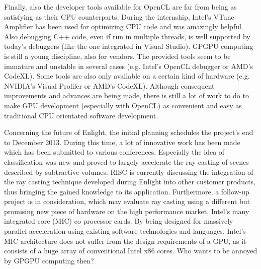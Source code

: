 Finally, also the developer tools available for OpenCL are far from being as satisfying as their CPU counterparts. During the internship, Intel's VTune Amplifier has been used for optimizing CPU code and was amazingly helpful. Also debugging C++ code, even if run in multiple threads, is well supported by today's debuggers (like the one integrated in Visual Studio). GPGPU computing is still a young discipline, also for vendors. The provided tools seem to be immature and unstable in several cases (e.g. Intel's OpenCL debugger or AMD's CodeXL). Some tools are also only available on a certain kind of hardware (e.g. NVIDIA's Visual Profiler or AMD's CodeXL). Although consequent improvements and advances are being made, there is still a lot of work to do to make GPU development (especially with OpenCL) as convenient and easy as traditional CPU orientated software development.

Concerning the future of Enlight, the initial planning schedules the project's end to December 2013. During this time, a lot of innovative work has been made which has been submitted to various conferences. Especially the idea of classification was new and proved to largely accelerate the ray casting of scenes described by subtractive volumes. RISC is currently discussing the integration of the ray casting technique developed during Enlight into other customer products, thus bringing the gained knowledge to its application. Furthermore, a follow-up project is in consideration, which may evaluate ray casting using a different but promising new piece of hardware on the high performance market, Intel's many integrated core (MIC) co processor cards. By being designed for massively parallel acceleration using existing software technologies and languages, Intel's MIC architecture does not suffer from the design requirements of a GPU, as it consists of a huge array of conventional Intel x86 cores. Who wants to be annoyed by GPGPU computing then?
